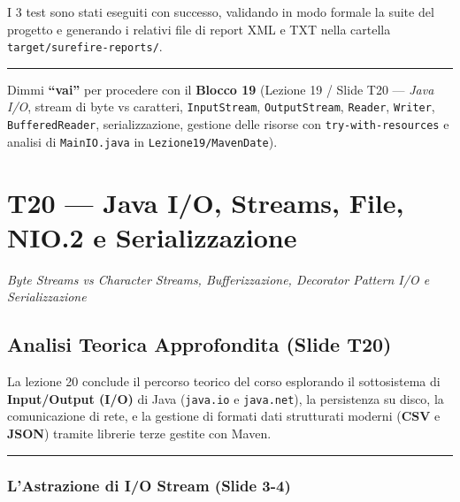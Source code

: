 \documentclass[11pt,a4paper,oneside]{report}
\newcommand{\passthrough}[1]{#1}
\begin{document}
I 3 test sono stati eseguiti con successo, validando in modo formale la
suite del progetto e generando i relativi file di report XML e TXT nella
cartella \passthrough{\lstinline!target/surefire-reports/!}.

\begin{center}\rule{0.5\linewidth}{0.5pt}\end{center}

Dimmi \textbf{``vai''} per procedere con il \textbf{Blocco 19} (Lezione
19 / Slide T20 --- \emph{Java I/O}, stream di byte vs caratteri,
\passthrough{\lstinline!InputStream!},
\passthrough{\lstinline!OutputStream!},
\passthrough{\lstinline!Reader!}, \passthrough{\lstinline!Writer!},
\passthrough{\lstinline!BufferedReader!}, serializzazione, gestione
delle risorse con \passthrough{\lstinline!try-with-resources!} e analisi
di \passthrough{\lstinline!MainIO.java!} in
\passthrough{\lstinline!Lezione19/MavenDate!}).

\newpage
\chapter[T20 --- Java I/O, Streams, File, NIO.2 e Se]{T20 --- Java I/O, Streams, File, NIO.2 e Serializzazione}
\label{chap:t20}

{\small\sffamily\color{accentblue!80!black}\textit{Byte Streams vs Character Streams, Bufferizzazione, Decorator Pattern I/O e Serializzazione}}

\vspace{0.8em}

\section{Analisi Teorica Approfondita (Slide
T20)}\label{chap19_analisi-teorica-approfondita-slide-t20}

La lezione 20 conclude il percorso teorico del corso esplorando il
sottosistema di \textbf{Input/Output (I/O)} di Java
(\passthrough{\lstinline!java.io!} e
\passthrough{\lstinline!java.net!}), la persistenza su disco, la
comunicazione di rete, e la gestione di formati dati strutturati moderni
(\textbf{CSV} e \textbf{JSON}) tramite librerie terze gestite con Maven.

\begin{center}\rule{0.5\linewidth}{0.5pt}\end{center}

\subsection{L'Astrazione di I/O Stream (Slide
3-4)}\label{chap19_lastrazione-di-io-stream-slide-3-4}
\end{document}
